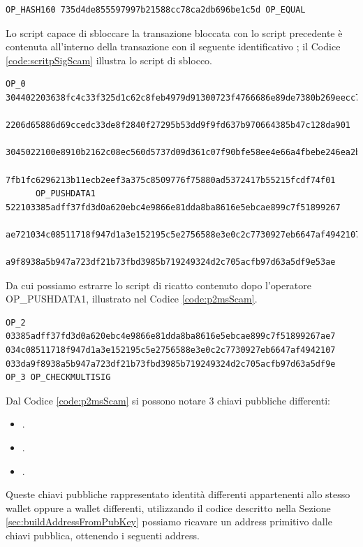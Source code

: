 \begin{example}
\begin{lstlisting}[language=bitcoinscript, label={code:scriptPubKeyScam}, caption={Script da cui è originato l'address preso in esempio.}]
      OP_HASH160 735d4de855597997b21588cc78ca2db696be1c5d OP_EQUAL
   \end{lstlisting}
   Lo script capace di sbloccare la transazione bloccata con lo script precedente è contenuta all'interno della transazione con il seguente identificativo ; il Codice \ref{code:scritpSigScam} illustra lo script di sblocco.
     \begin{lstlisting}[language=bitcoinscript, label={code:scritpSigScam}, caption={Script con cui è possibile eseguire con successo lo scrip illustrato nel Codice \ref{code:scriptPubKeyScam}.}]
      OP_0 304402203638fc4c33f325d1c62c8feb4979d91300723f4766686e89de7380b269eecc760
        2206d65886d69ccedc33de8f2840f27295b53dd9f9fd637b970664385b47c128da901
        3045022100e8910b2162c08ec560d5737d09d361c07f90bfe58ee4e66a4fbebe246ea2b32c0220
        7fb1fc6296213b11ecb2eef3a375c8509776f75880ad5372417b55215fcdf74f01
      OP_PUSHDATA1 522103385adff37fd3d0a620ebc4e9866e81dda8ba8616e5ebcae899c7f51899267
        ae721034c08511718f947d1a3e152195c5e2756588e3e0c2c7730927eb6647af494210721033d
        a9f8938a5b947a723df21b73fbd3985b719249324d2c705acfb97d63a5df9e53ae
     \end{lstlisting}
     Da cui possiamo estrarre lo script di ricatto contenuto dopo l'operatore OP\_PUSHDATA1, illustrato nel Codice \ref{code:p2msScam}.
     \begin{lstlisting}[language=bitcoinscript, label={code:p2msScam}, caption={Readme Script contenuto all'interno dello script di sblocco \ref{code:scritpSigScam}.}]
      OP_2 03385adff37fd3d0a620ebc4e9866e81dda8ba8616e5ebcae899c7f51899267ae7 034c08511718f947d1a3e152195c5e2756588e3e0c2c7730927eb6647af4942107 033da9f8938a5b947a723df21b73fbd3985b719249324d2c705acfb97d63a5df9e OP_3 OP_CHECKMULTISIG
    \end{lstlisting}
    Dal Codice \ref{code:p2msScam} si possono notare 3 chiavi pubbliche differenti:
    \begin{itemize}
      \item {}.
      \item {}.
      \item {}.
    \end{itemize}
    Queste chiavi pubbliche rappresentato identità differenti appartenenti allo stesso wallet oppure a wallet differenti, utilizzando il codice descritto nella Sezione \ref{sec:buildAddressFromPubKey} possiamo ricavare un address primitivo dalle chiavi pubblica, ottenendo i seguenti address.

\end{example}
